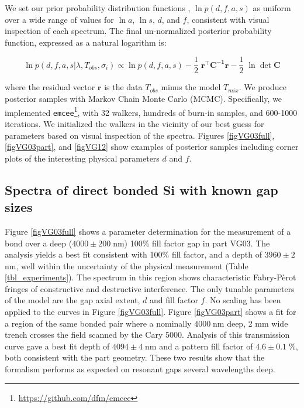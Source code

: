 \documentclass[osajnl,preprint,showpacs,superscriptaddress,12pt]{revtex4-1} %
\begin{document}
We set our prior probability distribution functions \cite{2013sdmm.book.....I}, $\ln{p(d,f,a,s)}$ as uniform over a wide range of values for $\ln{a}$, $\ln{s}$, $d$, and $f$, consistent with visual inspection of each spectrum.  The final un-normalized posterior probability function, expressed as a natural logarithm is:

\begin{equation}
	\ln{p(d,f,a,s|\lambda, T_{obs}, \sigma_i)} \propto \ln{p(d,f,a,s)} -\frac{1}{2}\;\boldsymbol{r^\intercal}\boldsymbol{C^{-1}}\boldsymbol{r} -\frac{1}{2}\;\ln{\det{\boldsymbol{C}}} \label{eqnPosterior}
\end{equation}

where the residual vector $\boldsymbol{r}$ is the data $T_{obs}$ minus the model $T_{mix}$.  We produce posterior samples with Markov Chain Monte Carlo (MCMC).  Specifically, we implemented \texttt{emcee}\footnote{\url{https://github.com/dfm/emcee}}\cite{emcee}, with 32 walkers, hundreds of burn-in samples, and 600-1000 iterations.  We initialized the walkers in the vicinity of our best guess for parameters based on visual inspection of the spectra.  Figures \ref{figVG03full}, \ref{figVG03part}, and \ref{figVG12} show examples of posterior samples including corner plots of the interesting physical parameters $d$ and $f$.

\subsection{Spectra of direct bonded Si with known gap sizes}
\label{secKnownGaps}

Figure \ref{figVG03full} shows a parameter determination for the measurement of a bond over a deep ($4000 \pm 200\;$nm) 100\% fill factor gap in part VG03.  The analysis yields a best fit consistent with 100\% fill factor, and a depth of $3960 \pm 2\;$nm, well within the uncertainty of the physical measurement (Table \ref{tbl_experiments}).  The spectrum in this region shows characteristic Fabry-P\`erot fringes of constructive and destructive interference.  The only tunable parameters of the model are the gap axial extent, $d$ and fill factor $f$.  No scaling has been applied to the curves in Figure \ref{figVG03full}.  Figure \ref{figVG03part} shows a fit for a region of the same bonded pair where a nominally $4000\;$nm deep, 2 mm wide trench crosses the field scanned by the Cary 5000.  Analysis of this transmission curve gave a best fit depth of $4094 \pm 4\;$nm and a pattern fill factor of $4.6 \pm 0.1\;\%$, both consistent with the part geometry.  These two results show that the formalism performs as expected on resonant gaps several wavelengths deep.
\end{document}
